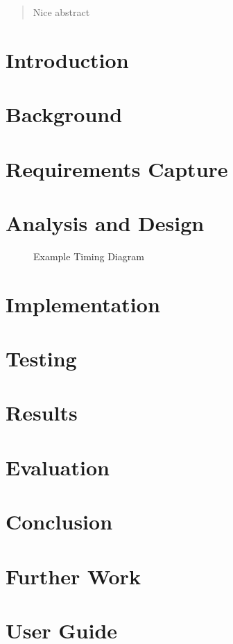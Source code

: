 \documentclass[12pt]{article}
\begin{document}


\setcounter{tocdepth}{2}
\tableofcontents

\newpage

\begin{abstract}
  Nice abstract
\end{abstract}

\section{Introduction}
\section{Background}
\section{Requirements Capture}
\section{Analysis and Design}
\begin{figure}[h]
  \centering
  
  \caption{Example Timing Diagram}
  \label{ExTD}
\end{figure}
\section{Implementation}
\section{Testing}
\section{Results}
\section{Evaluation}
\section{Conclusion}
\section{Further Work}
\section{User Guide}

\newpage
\appendix

% 


\end{document}
